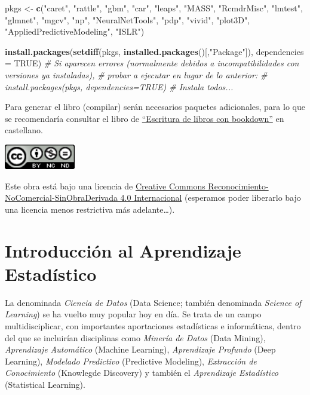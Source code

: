 \documentclass[
  spanish,
]{book}
\newenvironment{Shaded}{\begin{snugshade}}{\end{snugshade}}
\newcommand{\CommentTok}[1]{\textcolor[rgb]{0.56,0.35,0.01}{\textit{#1}}}
\newcommand{\DataTypeTok}[1]{\textcolor[rgb]{0.13,0.29,0.53}{#1}}
\newcommand{\KeywordTok}[1]{\textcolor[rgb]{0.13,0.29,0.53}{\textbf{#1}}}
\newcommand{\NormalTok}[1]{#1}
\newcommand{\OtherTok}[1]{\textcolor[rgb]{0.56,0.35,0.01}{#1}}
\newcommand{\StringTok}[1]{\textcolor[rgb]{0.31,0.60,0.02}{#1}}
\theoremstyle{break}
\theoremstyle{definition}
\theoremstyle{definition}
\theoremstyle{definition}
\theoremstyle{remark}
\begin{document}
\begin{Shaded}
\begin{Highlighting}[]
\NormalTok{pkgs <-}\StringTok{ }\KeywordTok{c}\NormalTok{(}\StringTok{"caret"}\NormalTok{, }\StringTok{"rattle"}\NormalTok{, }\StringTok{"gbm"}\NormalTok{, }\StringTok{"car"}\NormalTok{, }\StringTok{"leaps"}\NormalTok{, }\StringTok{"MASS"}\NormalTok{, }\StringTok{"RcmdrMisc"}\NormalTok{, }
          \StringTok{"lmtest"}\NormalTok{, }\StringTok{"glmnet"}\NormalTok{, }\StringTok{"mgcv"}\NormalTok{, }\StringTok{"np"}\NormalTok{, }\StringTok{"NeuralNetTools"}\NormalTok{, }\StringTok{"pdp"}\NormalTok{, }\StringTok{"vivid"}\NormalTok{,}
          \StringTok{"plot3D"}\NormalTok{, }\StringTok{"AppliedPredictiveModeling"}\NormalTok{, }\StringTok{"ISLR"}\NormalTok{)}

\KeywordTok{install.packages}\NormalTok{(}\KeywordTok{setdiff}\NormalTok{(pkgs, }\KeywordTok{installed.packages}\NormalTok{()[,}\StringTok{"Package"}\NormalTok{]), }\DataTypeTok{dependencies =} \OtherTok{TRUE}\NormalTok{)}
\CommentTok{# Si aparecen errores (normalmente debidos a incompatibilidades con versiones ya instaladas), }
\CommentTok{# probar a ejecutar en lugar de lo anterior:}
\CommentTok{# install.packages(pkgs, dependencies=TRUE) # Instala todos...}
\end{Highlighting}
\end{Shaded}

Para generar el libro (compilar) serán necesarios paquetes adicionales,
para lo que se recomendaría consultar el libro de \href{https://rubenfcasal.github.io/bookdown_intro}{``Escritura de libros con bookdown''} en castellano.

\includegraphics[width=1.22in]{images/by-nc-nd-88x31}

Este obra está bajo una licencia de \href{https://creativecommons.org/licenses/by-nc-nd/4.0/deed.es_ES}{Creative Commons Reconocimiento-NoComercial-SinObraDerivada 4.0 Internacional}
(esperamos poder liberarlo bajo una licencia menos restrictiva más adelante\ldots).

\hypertarget{intro-AE}{%
\chapter{Introducción al Aprendizaje Estadístico}\label{intro-AE}}

La denominada \emph{Ciencia de Datos} (Data Science; también denominada \emph{Science of Learning}) se ha vuelto muy popular hoy en día.
Se trata de un campo multidisciplicar, con importantes aportaciones estadísticas e informáticas, dentro del que se incluirían disciplinas como \emph{Minería de Datos} (Data Mining), \emph{Aprendizaje Automático} (Machine Learning), \emph{Aprendizaje Profundo} (Deep Learning), \emph{Modelado Predictivo} (Predictive Modeling), \emph{Extracción de Conocimiento} (Knowlegde Discovery) y también el \emph{Aprendizaje Estadístico} (Statistical Learning).
\end{document}
